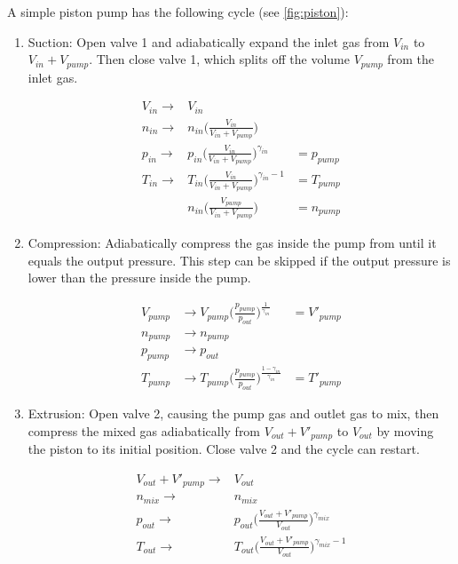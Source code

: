 \documentclass[12pt,a4paper]{article}
\numberwithin{equation}{section}
\begin{document}
A simple piston pump has the following cycle (see \autoref{fig:piston}):
\begin{enumerate}
\item Suction: Open valve 1 and adiabatically expand the inlet gas from $V_{in}$ to $V_{in}+V_{pump}$. Then close valve 1, which splits off the volume $V_{pump}$ from the inlet gas.

\begin{align}
V_{in} \longrightarrow & V_{in}\\
n_{in} \longrightarrow & n_{in}\Big(\frac{V_{in}}{V_{in}+V_{pump}}\Big)\\
p_{in} \longrightarrow & p_{in}\Big(\frac{V_{in}}{V_{in}+V_{pump}}\Big)^{\gamma_{in}}&=p_{pump}\\
T_{in} \longrightarrow & T_{in}\Big(\frac{V_{in}}{V_{in}+V_{pump}}\Big)^{\gamma_{in}-1}&=T_{pump}\\
&n_{in}\Big(\frac{V_{pump}}{V_{in}+V_{pump}}\Big)&=n_{pump}
\end{align}
\item Compression: Adiabatically compress the gas inside the pump from until it equals the output pressure. This step can be skipped if the output pressure is lower than the pressure inside the pump.

\begin{align}
V_{pump} &\longrightarrow V_{pump} \Big(\frac{p_{pump}}{p_{out}} \Big)^{\frac{1}{\gamma_{in}}}&= V'_{pump}\\
n_{pump} &\longrightarrow n_{pump}\\
p_{pump} &\longrightarrow p_{out}\\
T_{pump} &\longrightarrow T_{pump}\Big(\frac{p_{pump}}{p_{out}} \Big)^{\frac{1-\gamma_{in}}{\gamma_{in}}}&= T'_{pump}
\end{align}
\item Extrusion: Open valve 2, causing the pump gas and outlet gas to mix, then compress the mixed gas adiabatically from $V_{out} + V'_{pump}$ to $V_{out}$ by moving the piston to its initial position. Close valve 2 and the cycle can restart.

\begin{align}
V_{out}+V'_{pump} \longrightarrow & V_{out}\\
n_{mix} \longrightarrow & n_{mix}\\
p_{out} \longrightarrow & p_{out}\Big(\frac{V_{out}+V'_{pump}}{V_{out}}\Big)^{\gamma_{mix}}\\
T_{out} \longrightarrow & T_{out}\Big(\frac{V_{out}+V'_{pump}}{V_{out}}\Big)^{\gamma_{mix}-1}
\end{align}
\end{enumerate}
\end{document}
